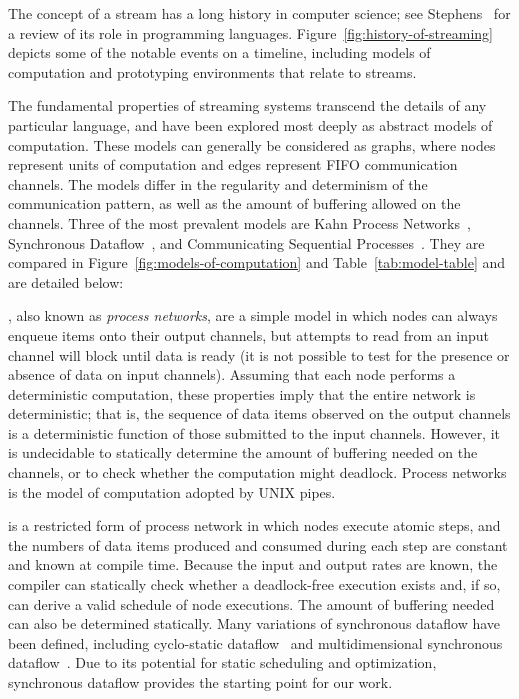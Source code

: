 The concept of a stream has a long history in computer science; see
Stephens~\cite{stephens_survey_1997} for a review of its role in
programming languages.  Figure~\ref{fig:history-of-streaming} depicts
some of the notable events on a timeline, including models of
computation and prototyping environments that relate to streams.

The fundamental properties of streaming systems transcend the details
of any particular language, and have been explored most deeply as
abstract models of computation.  These models can generally be
considered as graphs, where nodes represent units of computation and
edges represent FIFO communication channels.  The models differ in the
regularity and determinism of the communication pattern, as well as
the amount of buffering allowed on the channels.  Three of the most
prevalent models are Kahn Process Networks~\cite{kahn_semantics_1974},
Synchronous Dataflow~\cite{lee_static_1987}, and Communicating
Sequential Processes~\cite{hoare_communicating_1978}.  They are
compared in Figure~\ref{fig:models-of-computation} and
Table~\ref{tab:model-table} and are detailed below:

\mybegin

, also known as {\it process
  networks}, are a simple model in which nodes can always enqueue
  items onto their output channels, but attempts to read from an input
  channel will block until data is ready (it is not possible to test
  for the presence or absence of data on input channels).  Assuming
  that each node performs a deterministic computation, these
  properties imply that the entire network is deterministic; that is,
  the sequence of data items observed on the output channels is a
  deterministic function of those submitted to the input channels.
  However, it is undecidable to statically determine the amount of
  buffering needed on the channels, or to check whether the
  computation might deadlock.  Process networks is the model of
  computation adopted by UNIX pipes.

 is a restricted form of process
  network in which nodes execute atomic steps, and the numbers of data
  items produced and consumed during each step are constant and known
  at compile time.  Because the input and output rates are known, the
  compiler can statically check whether a deadlock-free execution
  exists and, if so, can derive a valid schedule of node executions.
  The amount of buffering needed can also be determined statically.
  Many variations of synchronous dataflow have been defined, including
  cyclo-static
  dataflow~\cite{bilsen_cyclo-static_1995,parks_comparison_1995} and
  multidimensional synchronous
  dataflow~\cite{murthy_multidimensional_2002}.  Due to its potential
  for static scheduling and optimization, synchronous dataflow
  provides the starting point for our work.

